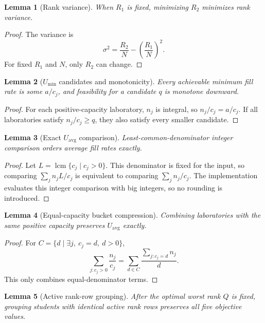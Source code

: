 \documentclass[11pt,a4paper]{article}
\newtheorem{lemma}{Lemma}
\begin{document}
\begin{lemma}[Rank variance]
When \(R_1\) is fixed, minimizing \(R_2\) minimizes rank variance.
\end{lemma}

\begin{proof}
The variance is
\[
  \sigma^2=\frac{R_2}{N}-\left(\frac{R_1}{N}\right)^2.
\]
For fixed \(R_1\) and \(N\), only \(R_2\) can change.
\end{proof}

\begin{lemma}[\(U_{\min}\) candidates and monotonicity]
Every achievable minimum fill rate is some \(a/c_j\), and feasibility for a
candidate \(q\) is monotone downward.
\end{lemma}

\begin{proof}
For each positive-capacity laboratory, \(n_j\) is integral, so
\(n_j/c_j=a/c_j\).  If all laboratories satisfy \(n_j/c_j\ge q\), they also
satisfy every smaller candidate.
\end{proof}

\begin{lemma}[Exact \(U_{\mathrm{avg}}\) comparison]
Least-common-denominator integer comparison orders average fill rates exactly.
\end{lemma}

\begin{proof}
Let \(L=\operatorname{lcm}\{c_j\mid c_j>0\}\).  This denominator is fixed for
the input, so comparing
\(\sum_j n_jL/c_j\) is equivalent to comparing
\(\sum_j n_j/c_j\).  The implementation evaluates this integer comparison
with big integers, so no rounding is introduced.
\end{proof}

\begin{lemma}[Equal-capacity bucket compression]
Combining laboratories with the same positive capacity preserves
\(U_{\mathrm{avg}}\) exactly.
\end{lemma}

\begin{proof}
For \(C=\{d\mid \exists j,\ c_j=d,\ d>0\}\),
\[
  \sum_{j:c_j>0}\frac{n_j}{c_j}
  =
  \sum_{d\in C}\frac{\sum_{j:c_j=d}n_j}{d}.
\]
This only combines equal-denominator terms.
\end{proof}

\begin{lemma}[Active rank-row grouping]
After the optimal worst rank \(Q\) is fixed, grouping students with identical
active rank rows preserves all five objective values.
\end{lemma}
\end{document}
